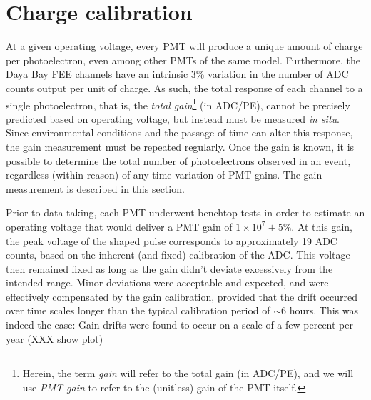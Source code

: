 \documentclass[../thesis.tex]{subfiles}
\begin{document}
\section{Charge calibration}
\label{sec:calibGain}

At a given operating voltage, every PMT will produce a unique amount of charge per photoelectron, even among other PMTs of the same model. Furthermore, the Daya Bay FEE channels have an intrinsic 3\% variation in the number of ADC counts output per unit of charge. As such, the total response of each channel to a single photoelectron, that is, the \emph{total gain}\footnote{Herein, the term \emph{gain} will refer to the total gain (in ADC/PE), and we will use \emph{PMT gain} to refer to the (unitless) gain of the PMT itself.} (in ADC/PE), cannot be precisely predicted based on operating voltage, but instead must be measured \emph{in situ}. Since environmental conditions and the passage of time can alter this response, the gain measurement must be repeated regularly. Once the gain is known, it is possible to determine the total number of photoelectrons observed in an event, regardless (within reason) of any time variation of PMT gains. The gain measurement is described in this section.

Prior to data taking, each PMT underwent benchtop tests in order to estimate an operating voltage that would deliver a PMT gain of $1 \times 10^7 \pm 5\%$. At this gain, the peak voltage of the shaped pulse corresponds to approximately 19 ADC counts, based on the inherent (and fixed) calibration of the ADC. This voltage then remained fixed as long as the gain didn't deviate excessively from the intended range. Minor deviations were acceptable and expected, and were effectively compensated by the gain calibration, provided that the drift occurred over time scales longer than the typical calibration period of $\sim$6 hours. This was indeed the case: Gain drifts were found to occur on a scale of a few percent per year (XXX show plot) 
\end{document}
